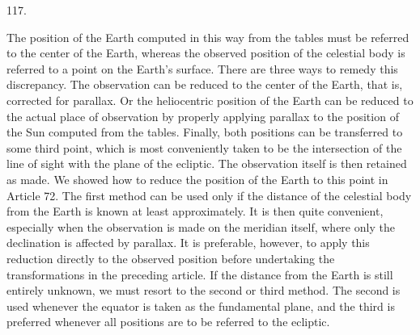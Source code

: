 \par\medskip
\begin{center}\hypertarget{native-164-article117}{}117.\end{center}
The position of the Earth computed in this way from the tables must be referred to the center of the Earth, whereas the observed position of the celestial body is referred to a point on the Earth's surface. There are three ways to remedy this discrepancy. The observation can be reduced to the center of the Earth, that is, corrected for parallax. Or the heliocentric position of the Earth can be reduced to the actual place of observation by properly applying parallax to the position of the Sun computed from the tables. Finally, both positions can be transferred to some third point, which is most conveniently taken to be the intersection of the line of sight with the plane of the ecliptic. The observation itself is then retained as made. We showed how to reduce the position of the Earth to this point in Article 72. The first method can be used only if the distance of the celestial body from the Earth is known at least approximately. It is then quite convenient, especially when the observation is made on the meridian itself, where only the declination is affected by parallax. It is preferable, however, to apply this reduction directly to the observed position before undertaking the transformations in the preceding article. If the distance from the Earth is still entirely unknown, we must resort to the second or third method. The second is used whenever the equator is taken as the fundamental plane, and the third is preferred whenever all positions are to be referred to the ecliptic.
